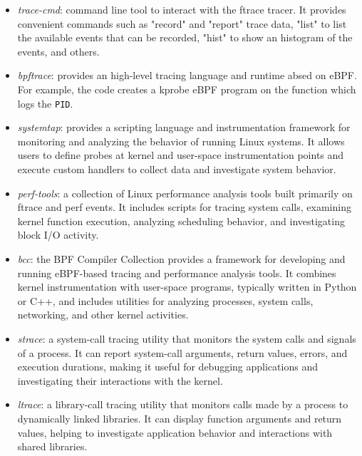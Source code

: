 \begin{itemize}

  \item \textit{trace-cmd}: command line tool to interact with the ftrace
    tracer. It provides convenient commands such as "record" and "report" trace
    data, "list" to list the available events that can be recorded, "hist" to
    show an histogram of the events, and others.

  \item \textit{bpftrace}: provides an high-level tracing language and runtime
    absed on eBPF. For example, the code  creates a kprobe eBPF program on the
     function which logs the \verb|PID|.

 \item \textit{systemtap}: provides a scripting language and instrumentation
   framework for monitoring and analyzing the behavior of running Linux systems.
    It allows users to define probes at kernel and user-space instrumentation
    points and execute custom handlers to collect data and investigate system
    behavior.

  \item \textit{perf-tools}: a collection of Linux performance analysis tools
    built primarily on ftrace and perf events. It includes scripts for tracing
    system calls, examining kernel function execution, analyzing scheduling
    behavior, and investigating block I/O activity.

  \item \textit{bcc}: the BPF Compiler Collection provides a framework for
    developing and running eBPF-based tracing and performance analysis tools. It
    combines kernel instrumentation with user-space programs, typically written
    in Python or C++, and includes utilities for analyzing processes, system
    calls, networking, and other kernel activities.

  \item \textit{strace}: a system-call tracing utility that monitors the system
    calls and signals of a process. It can report system-call arguments, return
    values, errors, and execution durations, making it useful for debugging
    applications and investigating their interactions with the kernel.

  \item \textit{ltrace}: a library-call tracing utility that monitors calls made
    by a process to dynamically linked libraries. It can display function
    arguments and return values, helping to investigate application behavior and
    interactions with shared libraries.

\end{itemize}
